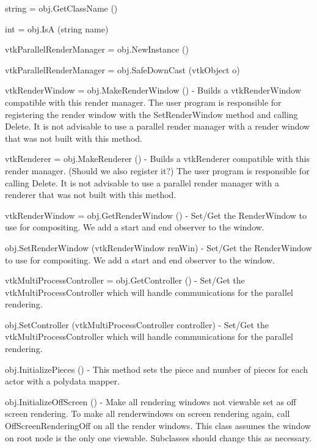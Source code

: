 \begin{DoxyItemize}
\item {\ttfamily string = obj.\-Get\-Class\-Name ()}  
\item {\ttfamily int = obj.\-Is\-A (string name)}  
\item {\ttfamily vtk\-Parallel\-Render\-Manager = obj.\-New\-Instance ()}  
\item {\ttfamily vtk\-Parallel\-Render\-Manager = obj.\-Safe\-Down\-Cast (vtk\-Object o)}  
\item {\ttfamily vtk\-Render\-Window = obj.\-Make\-Render\-Window ()} -\/ Builds a vtk\-Render\-Window compatible with this render manager. The user program is responsible for registering the render window with the Set\-Render\-Window method and calling Delete. It is not advisable to use a parallel render manager with a render window that was not built with this method.  
\item {\ttfamily vtk\-Renderer = obj.\-Make\-Renderer ()} -\/ Builds a vtk\-Renderer compatible with this render manager. (Should we also register it?) The user program is responsible for calling Delete. It is not advisable to use a parallel render manager with a renderer that was not built with this method.  
\item {\ttfamily vtk\-Render\-Window = obj.\-Get\-Render\-Window ()} -\/ Set/\-Get the Render\-Window to use for compositing. We add a start and end observer to the window.  
\item {\ttfamily obj.\-Set\-Render\-Window (vtk\-Render\-Window ren\-Win)} -\/ Set/\-Get the Render\-Window to use for compositing. We add a start and end observer to the window.  
\item {\ttfamily vtk\-Multi\-Process\-Controller = obj.\-Get\-Controller ()} -\/ Set/\-Get the vtk\-Multi\-Process\-Controller which will handle communications for the parallel rendering.  
\item {\ttfamily obj.\-Set\-Controller (vtk\-Multi\-Process\-Controller controller)} -\/ Set/\-Get the vtk\-Multi\-Process\-Controller which will handle communications for the parallel rendering.  
\item {\ttfamily obj.\-Initialize\-Pieces ()} -\/ This method sets the piece and number of pieces for each actor with a polydata mapper.  
\item {\ttfamily obj.\-Initialize\-Off\-Screen ()} -\/ Make all rendering windows not viewable set as off screen rendering. To make all renderwindows on screen rendering again, call Off\-Screen\-Rendering\-Off on all the render windows. This class assumes the window on root node is the only one viewable. Subclasses should change this as necessary.  

\end{DoxyItemize}
